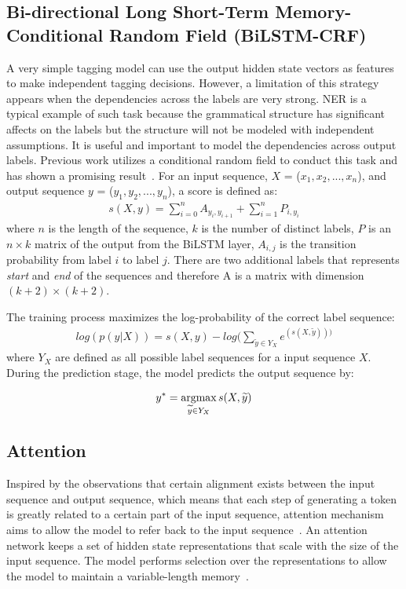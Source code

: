 \subsection{Bi-directional Long Short-Term Memory-Conditional Random Field (BiLSTM-CRF)}
A very simple tagging model can use the output hidden state vectors as features to make independent tagging decisions. However, a limitation of this strategy appears when the dependencies across the labels are very strong. NER is a typical example of such task because the grammatical structure has significant affects on the labels but the structure will not be modeled with independent assumptions. It is useful and important to model the dependencies across output labels. Previous work utilizes a conditional random field to conduct this task and has shown a promising result~\citep{lafferty2001conditional}. For an input sequence, $X$ = ($x_1, x_2, ..., x_n$), and output sequence $y$ = ($y_1, y_2, ..., y_n$), a score is defined as:\\
\begin{align*}
    s(X,y)= \sum_{i=0}^{n} A_{y_i, y_{i+1}} + \sum_{i=1}^{n} P_{i, y_i}
\end{align*}
where $n$ is the length of the sequence, $k$ is the number of distinct labels, $P$ is an $n \times k$ matrix of the output from the BiLSTM layer, $A_{i,j}$ is the transition probability from label $i$ to label $j$. There are two additional labels that represents \textit{start} and \textit{end} of the sequences and therefore A is a matrix with dimension $(k+2)\times(k+2)$.

The training process maximizes the log-probability of the correct label sequence: 
\begin{align*}
    log(p(y|X)) = s(X,y) - log(\sum_{\widetilde{y}\in Y_X} e^{(s(X, \widetilde{y})))}
\end{align*}
where $Y_X$ are defined as all possible label sequences for a input sequence $X$. During the prediction stage, the model predicts the output sequence by:

\begin{align*}
   y^* = \operatorname*{argmax}_{\widetilde{y}\in Y_X} s(X, \widetilde{y})
\end{align*}
\subsection{Attention}
Inspired by the observations that certain alignment exists between the input sequence and output sequence, which means that each step of generating a token is greatly related to a certain part of the input sequence, attention mechanism aims to allow the model to refer back to the input sequence~\citep{young2018recent}. An attention network keeps a set of hidden state representations that scale with the size of the input sequence. The model performs selection over the representations to allow the model to maintain a variable-length memory~\citep{structatten}. 


